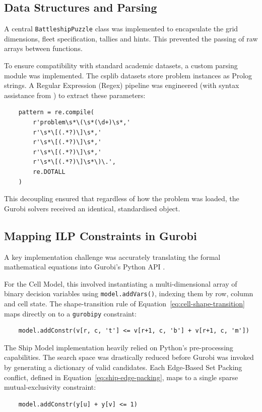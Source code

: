 \subsection{Data Structures and Parsing}\label{subsec:data-structures-parsing}
A central \verb|BattleshipPuzzle| class was implemented to encapsulate the grid dimensions, fleet specification, tallies and hints. This prevented the passing of raw arrays between functions.

To ensure compatibility with standard academic datasets, a custom parsing module was implemented. The \gls{csplib} datasets store problem instances as Prolog strings. A Regular Expression (Regex) pipeline was engineered (with syntax assistance from \citet{gemini}) to extract these parameters:
\begin{verbatim}
    pattern = re.compile(
        r'problem\s*\(\s*(\d+)\s*,'      
        r'\s*\[(.*?)\]\s*,'              
        r'\s*\[(.*?)\]\s*,'              
        r'\s*\[(.*?)\]\s*,'              
        r'\s*\[(.*?)\]\s*\)\.',          
        re.DOTALL
    )
\end{verbatim}
This decoupling ensured that regardless of how the problem was loaded, the Gurobi solvers received an identical, standardised object.

\subsection{Mapping ILP Constraints in Gurobi}\label{subsec:mapping-ilp-constraints-gurobi}
A key implementation challenge was accurately translating the formal mathematical equations into Gurobi's Python API \citep{gurobi2024}.

For the Cell Model, this involved instantiating a multi-dimensional array of binary decision variables using \verb|model.addVars()|, indexing them by row, column and cell state. The shape-transition rule of Equation~\eqref{eq:cell-shape-transition} maps directly on to a \verb|gurobipy| constraint:
\begin{verbatim}
    model.addConstr(v[r, c, 't'] <= v[r+1, c, 'b'] + v[r+1, c, 'm'])
\end{verbatim}

The Ship Model implementation heavily relied on Python's pre-processing capabilities. The search space was drastically reduced before Gurobi was invoked by generating a dictionary of valid candidates. Each Edge-Based Set Packing conflict, defined in Equation~\eqref{eq:ship-edge-packing}, maps to a single sparse mutual-exclusivity constraint:
\begin{verbatim}
    model.addConstr(y[u] + y[v] <= 1)
\end{verbatim}

